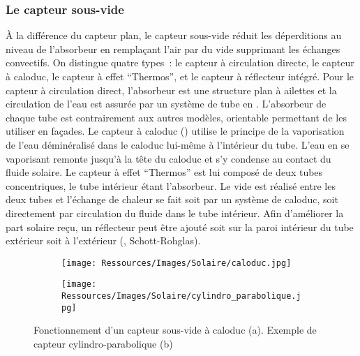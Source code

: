 \subsubsection{Le capteur sous-vide} %
\label{ssub:le_capteur_sous_vide}
À la différence du capteur plan, le capteur sous-vide réduit les déperditions au niveau de
l’absorbeur en remplaçant l’air par du vide supprimant les échanges convectifs. On
distingue quatre types~: le capteur à circulation directe, le capteur à caloduc, le
capteur à effet \enquote{Thermos}, et le capteur à réflecteur intégré. Pour le capteur à
circulation direct, l’absorbeur est une structure plan à ailettes et la circulation de
l’eau est assurée par un système de tube en . L’absorbeur de chaque tube est
contrairement aux autres modèles, orientable permettant de les utiliser en façades. Le
capteur à caloduc () utilise le principe de la vaporisation
de l’eau déminéralisé dans le caloduc lui-même à l’intérieur du tube. L’eau en se
vaporisant remonte jusqu’à la tête du caloduc et s’y condense au contact du fluide
solaire. Le capteur à effet \enquote{Thermos} est lui composé de deux tubes concentriques,
le tube intérieur étant l’absorbeur. Le vide est réalisé entre les deux tubes et l’échange
de chaleur se fait soit par un système de caloduc, soit directement par circulation du
fluide dans le tube intérieur. Afin d’améliorer la part solaire reçu, un réflecteur peut
être ajouté soit sur la paroi intérieur du tube extérieur soit à l’extérieur
(, Schott-Rohglas).

\begin{figure}
    \centering
    \begin{subfigure}[b]{0.35\textwidth}
        \texttt{[image: Ressources/Images/Solaire/caloduc.jpg]}
        \caption{}
        \label{fig:capteur_sous_vide}
    \end{subfigure}
    \quad
    \begin{subfigure}[b]{0.55\textwidth}
        \texttt{[image: Ressources/Images/Solaire/cylindro\_parabolique.jpg]}
        \caption{}
        \label{fig:capteur_cylindro_parabolique}
    \end{subfigure}
    \caption[Description des capteurs plans]
             {Fonctionnement d’un capteur sous-vide à caloduc (a). Exemple de
              capteur cylindro-parabolique (b)}
    \label{fig:capteur_vide_parabolique}
\end{figure}


